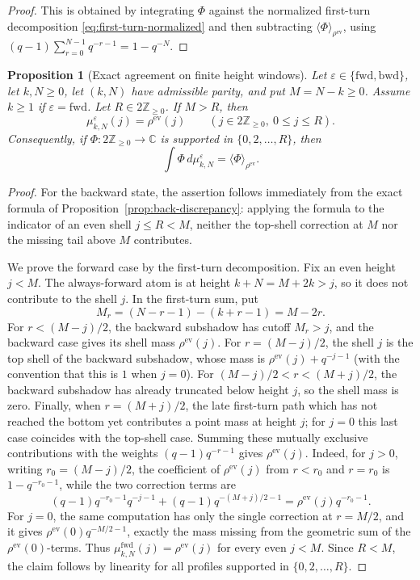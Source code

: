 \documentclass[11pt]{amsart}
\theoremstyle{definition}
\theoremstyle{plain}
\newtheorem{proposition}[definition]{Proposition}
\newcommand{\ZZ}{\mathbb Z}
\newcommand{\CC}{\mathbb C}
\newcommand{\fwd}{\mathrm{fwd}}
\newcommand{\bwd}{\mathrm{bwd}}
\newcommand{\ev}{\mathrm{ev}}
\newcommand{\ang}{\langle}
\newcommand{\rang}{\rangle}
\begin{document}
\begin{proof}
This is obtained by integrating \(\Phi\) against the normalized first-turn
decomposition \eqref{eq:first-turn-normalized} and then subtracting
\(\ang\Phi\rang_{\rho^{\ev}}\), using
\((q-1)\sum_{r=0}^{N-1}q^{-r-1}=1-q^{-N}\).
\end{proof}


\begin{proposition}[Exact agreement on finite height windows]\label{prop:finite-window-exact}
Let \(\varepsilon\in\{\fwd,\bwd\}\), let \(k,N\ge0\), let \((k,N)\) have
admissible parity, and put
\(M=N-k\ge0\).  Assume \(k\ge1\) if \(\varepsilon=\fwd\).  Let
\(R\in2\ZZ_{\ge0}\).  If \(M>R\), then
\[
\mu^{\varepsilon}_{k,N}(j)=\rho^{\ev}(j)\qquad (j\in2\ZZ_{\ge0},\ 0\le j\le R).
\]
Consequently, if \(\Phi:2\ZZ_{\ge0}\to\CC\) is supported in \(\{0,2,\ldots,R\}\), then
\[
\int \Phi\,d\mu^{\varepsilon}_{k,N}=\ang\Phi\rang_{\rho^{\ev}}.
\]
\end{proposition}

\begin{proof}
For the backward state, the assertion follows immediately from the exact formula
of Proposition~\ref{prop:back-discrepancy}: applying the formula to the indicator
of an even shell \(j\le R<M\), neither the top-shell correction at \(M\) nor the
missing tail above \(M\) contributes.

We prove the forward case by the first-turn decomposition.  Fix an even height
\(j<M\).  The always-forward atom is at height \(k+N=M+2k>j\), so it does not
contribute to the shell \(j\).  In the first-turn sum, put
\[
M_r=(N-r-1)-(k+r-1)=M-2r.
\]
For \(r<(M-j)/2\), the backward subshadow has cutoff \(M_r>j\), and the backward
case gives its shell mass \(\rho^{\ev}(j)\).  For \(r=(M-j)/2\), the shell \(j\) is
the top shell of the backward subshadow, whose mass is \(\rho^{\ev}(j)+q^{-j-1}\)
(with the convention that this is \(1\) when \(j=0\)).  For \((M-j)/2<r<(M+j)/2\),
the backward subshadow has already truncated below height \(j\), so the shell
mass is zero.  Finally, when \(r=(M+j)/2\), the late first-turn path which has not
reached the bottom yet contributes a point mass at height \(j\); for \(j=0\) this
last case coincides with the top-shell case.  Summing these mutually exclusive
contributions with the weights \((q-1)q^{-r-1}\) gives \(\rho^{\ev}(j)\).  Indeed,
for \(j>0\), writing \(r_0=(M-j)/2\), the coefficient of \(\rho^{\ev}(j)\) from
\(r<r_0\) and \(r=r_0\) is \(1-q^{-r_0-1}\), while the two correction terms are
\[
(q-1)q^{-r_0-1}q^{-j-1}+(q-1)q^{-(M+j)/2-1}
=\rho^{\ev}(j)q^{-r_0-1}.
\]
For \(j=0\), the same computation has only the single correction at \(r=M/2\),
and it gives \(\rho^{\ev}(0)q^{-M/2-1}\), exactly the mass missing from the
geometric sum of the \(\rho^{\ev}(0)\)-terms.  Thus
\(\mu^{\fwd}_{k,N}(j)=\rho^{\ev}(j)\) for every even \(j<M\).  Since \(R<M\), the
claim follows by linearity for all profiles supported in \(\{0,2,\ldots,R\}\).
\end{proof}
\end{document}
